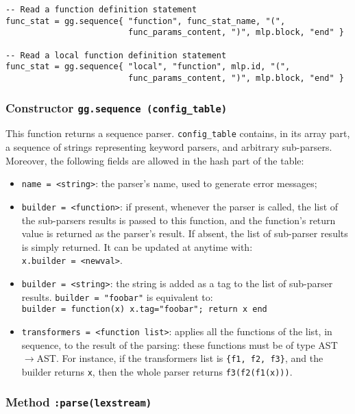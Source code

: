 \begin{Verbatim}[fontsize=\scriptsize]
-- Read a function definition statement
func_stat = gg.sequence{ "function", func_stat_name, "(",
                         func_params_content, ")", mlp.block, "end" }

-- Read a local function definition statement
func_stat = gg.sequence{ "local", "function", mlp.id, "(",
                         func_params_content, ")", mlp.block, "end" }

\end{Verbatim}

\subsubsection{Constructor {\tt gg.sequence (config\_table) }}

This function returns a sequence parser. \verb|config_table| contains,
in its array part, a sequence of strings representing keyword parsers,
and arbitrary sub-parsers. Moreover, the following fields are allowed
in the hash part of the table:

\begin{itemize}
\item\verb|name = <string>|: the parser's name, used to generate error
  messages;
\item\verb|builder = <function>|: if present, whenever the parser is
  called, the list of the sub-parsers results is passed to this
  function, and the function's return value is returned as the
  parser's result. If absent, the list of sub-parser results is simply
  returned. It can be updated at anytime with:\\
  \verb|x.builder = <newval>|.
\item\verb|builder = <string>|: the string is added as a tag to the
  list of sub-parser results. \verb|builder = "foobar"| is equivalent
  to:\\
 \verb|builder = function(x) x.tag="foobar"; return x end|
\item\verb|transformers = <function list>|: applies all the functions
  of the list, in sequence, to the result of the parsing: these
  functions must be of type AST$\rightarrow$AST. For instance, if the
  transformers list is {\tt\{f1, f2, f3\}}, and the builder returns
  {\tt x}, then the whole parser returns {\tt f3(f2(f1(x)))}.
\end{itemize}

\subsubsection{Method {\tt :parse(lexstream)}}

